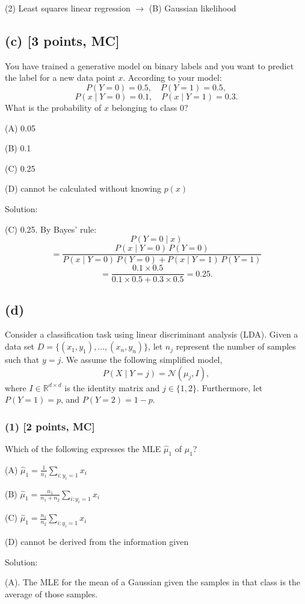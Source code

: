 \documentclass[twocolumn]{article}
\begin{document}
\begin{spacing}{1}
(2) Least squares linear regression \(\rightarrow\) (B) Gaussian likelihood

\subsection*{(c) [3 points, MC]}
You have trained a generative model on binary labels and you want to predict the label for a new data point \(x\). According to your model:
\[
P(Y=0)=0.5,\quad P(Y=1)=0.5,
\]
\[
P(x\mid Y=0)=0.1,\quad P(x\mid Y=1)=0.3.
\]
What is the probability of \(x\) belonging to class 0?

(A) 0.05

(B) 0.1

(C) 0.25

(D) cannot be calculated without knowing \(p(x)\)

Solution:

(C) 0.25. By Bayes' rule:
\[
P(Y=0\mid x)
\]
\[= \frac{P(x\mid Y=0)\,P(Y=0)}{P(x\mid Y=0)\,P(Y=0) + P(x\mid Y=1)\,P(Y=1)} 
\]
\[
= \frac{0.1\times 0.5}{0.1\times 0.5 + 0.3\times 0.5} = 0.25.
\]

\subsection*{(d)}
Consider a classification task using linear discriminant analysis (LDA). Given a data set \(D=\{(x_1,y_1),\ldots,(x_n,y_n)\}\), let \(n_j\) represent the number of samples such that \(y=j\). We assume the following simplified model,
\[
P(X\mid Y=j) = \mathcal{N}(\mu_j, I),
\]
where \(I\in \mathbb{R}^{d\times d}\) is the identity matrix and \(j\in\{1,2\}\). Furthermore, let \(P(Y=1)=p\), and \(P(Y=2)=1-p\).

\subsubsection*{(1) [2 points, MC]}
Which of the following expresses the MLE \(\hat{\mu}_1\) of \(\mu_1\)?

(A) \(\hat{\mu}_1 = \frac{1}{n_1}\sum_{i:y_i=1} x_i\)

(B) \(\hat{\mu}_1 = \frac{n_1}{n_1+n_2}\sum_{i:y_i=1} x_i\)

(C) \(\hat{\mu}_1 = \frac{n_1}{n_2}\sum_{i:y_i=1} x_i\)

(D) cannot be derived from the information given

Solution:

(A). The MLE for the mean of a Gaussian given the samples in that class is the average of those samples.


\end{spacing}
\end{document}
